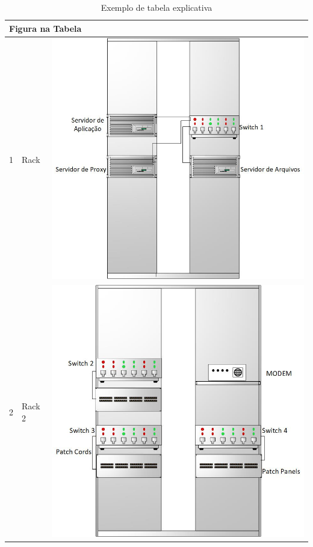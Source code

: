 \begin{table}[h!]
\centering
\caption{Exemplo de tabela explicativa}
\label{tab1}
\begin{tabular}{|l|l|l|}
\hline
\multicolumn{3}{|l|}{Figura na Tabela} \\ \hline
1        & Rack          & \includegraphics[scale=0.4]{rack1}        \\ \hline
2        & Rack 2        & \includegraphics[scale=0.4]{rack2}        \\ \hline
\end{tabular}
\end{table}